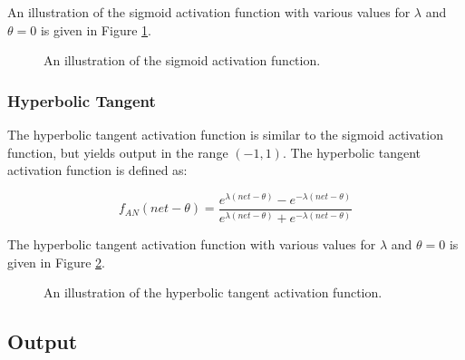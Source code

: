 An illustration of the sigmoid activation function with various values for $\lambda$ and $\theta = 0$
is given in Figure \ref{fig:anns:activation_functions:sigmoid}.

\begin{figure}[htpb]
    \centering
    \resizebox{0.8\textwidth}{!}{}
    \caption[The sigmoid activation
    function]{An illustration of the sigmoid activation function.}
    \label{fig:anns:activation_functions:sigmoid}
\end{figure}


\subsubsection{Hyperbolic Tangent}
\label{sec:anns:an:act_functions:tanh}

The hyperbolic tangent activation function is similar to the sigmoid
activation function, but yields output in the range
$(-1, 1)$. The hyperbolic tangent
activation function is defined as:
	
\begin{equation}
    f_{AN}(net - \theta) = \frac{e^{\lambda(net - \theta)}-e^{-\lambda(net - \theta)}}{e^{\lambda(net - \theta)}+e^{-\lambda(net - \theta)}}
    \label{eq:hyperbolic_tangent}
\end{equation}

\noindent The hyperbolic tangent activation function with various values for $\lambda$ and $\theta = 0$
is given in Figure \ref{fig:anns:activation_functions:hyperbolic_tangent}.

\begin{figure}[htpb]
    \centering
    \resizebox{0.8\textwidth}{!}{}
    \vspace{10pt}
    \caption[The hyperbolic tangent activation function]{An illustration of the hyperbolic tangent activation function.}
    \label{fig:anns:activation_functions:hyperbolic_tangent}
\end{figure}


\subsection{Output}
\label{sec:anns:an:output}

